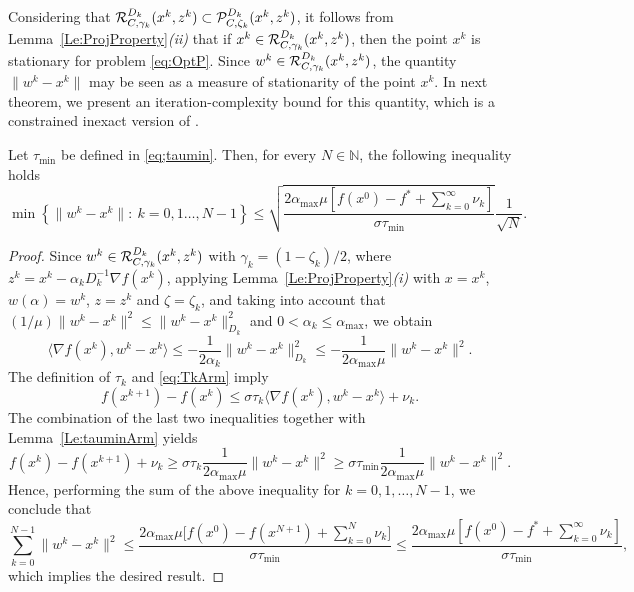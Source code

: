Considering  that $ {\cal R}_{C,\gamma_k}^{D_k}(x^{k}, z^k) \subset {\cal P}_{C, \zeta_k}^{D_k}(x^{k}, z^k)$, it follows from Lemma~\ref{Le:ProjProperty}{\it (ii)}  that if $x^k \in {\cal R}_{C,\gamma_k}^{D_k}(x^{k}, z^k)$, then the point $x^k$ is stationary for problem \eqref{eq:OptP}. Since $w^k \in {\cal R}_{C,\gamma_k}^{D_k}(x^{k}, z^k)$, the quantity $\|w^k-x^k\|$ may be seen as a measure of stationarity of the point $x^k$. In next theorem, we present an iteration-complexity bound for this quantity,  which is a constrained inexact  version of  \cite[Theorem~1]{GrapigliaSachs2017}.

\begin{theorem} \label{eq:theocomp}
	Let $ \tau_{\min}$ be defined in \eqref{eq;taumin}. Then, for every $N \in \mathbb{N}$, the following inequality holds
	$$
		\min\left\{\|w^k-x^k\| :~ k= 0, 1 \ldots, N-1\right\} \leq \sqrt{\frac{2{\alpha_{\max}}\mu\left[ f(x^0)-f^* +\sum_{k= 0}^{\infty}\nu_k\right] }{\sigma \tau_{\min}}} \frac{1}{\sqrt{N}}.
	$$
\end{theorem}

\begin{proof}
	Since  $w^k \in   {\cal R}_{C,\gamma_k}^{D_k}(x^{k}, z^k)$ with    $\gamma_k=(1-\zeta_k)/2$, where $z^k = x^{k}-\alpha_k D^{-1} _k\nabla f(x^{k})$,  applying  Lemma~\ref{Le:ProjProperty}{\it (i)} with $x=x^k$, $w(\alpha) = w^k$, $z = z^k$ and $\zeta= \zeta_k$, and taking into account that $(1/\mu)  \|w^k-x^k\|^2 \leq  \|w^k-x^k\|_{D_k}^2$  and $0<\alpha_k \leq \alpha_{\max}$, we obtain
	\begin{equation*}\label{eq:fD2}
		\big\langle \nabla f(x^{k}), w^k-x^{k}\big\rangle \leq -\frac{1}{2\alpha_k} \|w^k-x^k\|_{D_k}^2\leq -\frac{1}{2\alpha_{\max}\mu} \|w^k-x^k\|^2.
	\end{equation*}
	The definition of $\tau_k$  and \eqref{eq:TkArm} imply  
	$$f(x^{k+1}) - f(x^k) \leq \sigma\tau_k \big\langle \nabla f(x^{k}),  w^k-x^{k} \big\rangle+\nu_k.$$ 
	The combination of the last two inequalities together with Lemma~\ref{Le:tauminArm} yields
	$$
		f(x^k) - f(x^{k+1})+\nu_k \geq \sigma\tau_k \frac{1}{2\alpha_{\max}\mu} \|w^k-x^k\|^2 \geq \sigma \tau_{\min} \frac{1}{2\alpha_{\max}\mu} \|w^k-x^k\|^2.
	$$
	Hence, performing the sum of the above inequality for $k= 0, 1,\ldots, N-1$, we conclude that
	$$
		\sum_{k= 0}^{N-1} \|w^k - x^k\|^2 \leq \frac{2{\alpha_{\max}}\mu \big[f(x^0) - f(x^{N+1})+ \sum_{k= 0}^{N}\nu_k\big]}{\sigma \tau_{\min}}\leq \frac{2{\alpha_{\max}}\mu \left[ f(x^0) - f^*+ \sum_{k= 0}^{\infty}\nu_k\right]}{\sigma \tau_{\min}},
	$$
	which implies the desired result.
\end{proof}


